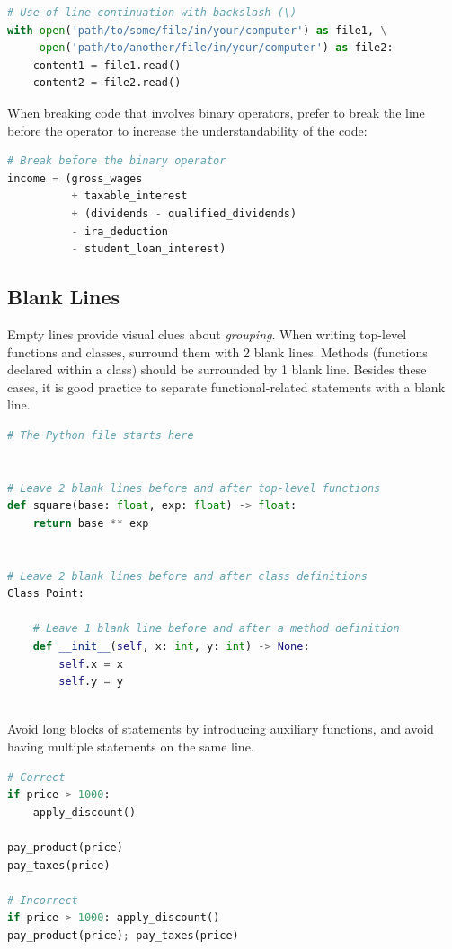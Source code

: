 \documentclass{tufte-handout}
\begin{document}
\begin{lstlisting}[numbers=none,language=python]
# Use of line continuation with backslash (\)
with open('path/to/some/file/in/your/computer') as file1, \
     open('path/to/another/file/in/your/computer') as file2:
    content1 = file1.read()
    content2 = file2.read()
\end{lstlisting}

When breaking code that involves binary operators, prefer to break the line before the operator to increase the understandability of the code:

\begin{lstlisting}[numbers=none,language=python]
# Break before the binary operator
income = (gross_wages
          + taxable_interest
          + (dividends - qualified_dividends)
          - ira_deduction
          - student_loan_interest)
\end{lstlisting}

\subsection{Blank Lines}

Empty lines provide visual clues about \emph{grouping}.
When writing top-level functions and classes, surround them with 2 blank lines.
Methods (functions declared within a class) should be surrounded by 1 blank line.	
Besides these cases, it is good practice to separate functional-related statements with a blank line.

\begin{lstlisting}[numbers=none,language=python]
# The Python file starts here


# Leave 2 blank lines before and after top-level functions
def square(base: float, exp: float) -> float:
    return base ** exp


# Leave 2 blank lines before and after class definitions
Class Point:
	
	# Leave 1 blank line before and after a method definition	
	def __init__(self, x: int, y: int) -> None:
	    self.x = x
	    self.y = y
     
\end{lstlisting}

Avoid long blocks of statements by introducing auxiliary functions, and avoid having multiple statements on the same line.

\begin{lstlisting}[numbers=none,language=python]
# Correct
if price > 1000:
    apply_discount()

pay_product(price)
pay_taxes(price)

# Incorrect
if price > 1000: apply_discount()
pay_product(price); pay_taxes(price)
\end{lstlisting}
\end{document}
